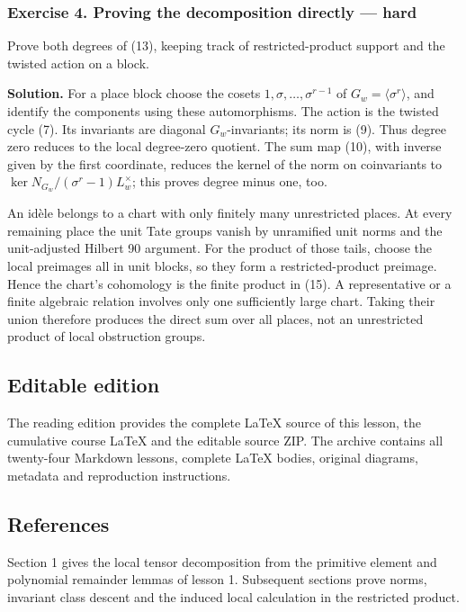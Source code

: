 \documentclass[11pt,a4paper]{article}
\begin{document}
\subsubsection{Exercise 4. Proving the decomposition directly ---
hard}\label{exercise-4.-proving-the-decomposition-directly-hard}

Prove both degrees of (13), keeping track of restricted-product support
and the twisted action on a block.

\textbf{Solution.} For a place block choose the cosets
\(1,\sigma,\ldots,\sigma^{r-1}\) of \(G_w=\langle\sigma^r\rangle\), and
identify the components using these automorphisms. The action is the
twisted cycle (7). Its invariants are diagonal \(G_w\)-invariants; its
norm is (9). Thus degree zero reduces to the local degree-zero quotient.
The sum map (10), with inverse given by the first coordinate, reduces
the kernel of the norm on coinvariants to
\(\ker N_{G_w}/(\sigma^r-1)L_w^\times\); this proves degree minus one,
too.

An idèle belongs to a chart with only finitely many unrestricted places.
At every remaining place the unit Tate groups vanish by unramified unit
norms and the unit-adjusted Hilbert 90 argument. For the product of
those tails, choose the local preimages all in unit blocks, so they form
a restricted-product preimage. Hence the chart's cohomology is the
finite product in (15). A representative or a finite algebraic relation
involves only one sufficiently large chart. Taking their union therefore
produces the direct sum over all places, not an unrestricted product of
local obstruction groups.

\subsection{Editable edition}\label{editable-edition}

The reading edition provides the complete LaTeX source of this lesson,
the cumulative course LaTeX and the editable source ZIP. The archive
contains all twenty-four Markdown lessons, complete LaTeX bodies,
original diagrams, metadata and reproduction instructions.

\subsection{References}\label{references}

Section 1 gives the local tensor decomposition from the primitive
element and polynomial remainder lemmas of lesson 1. Subsequent sections
prove norms, invariant class descent and the induced local calculation
in the restricted product.
\end{document}
